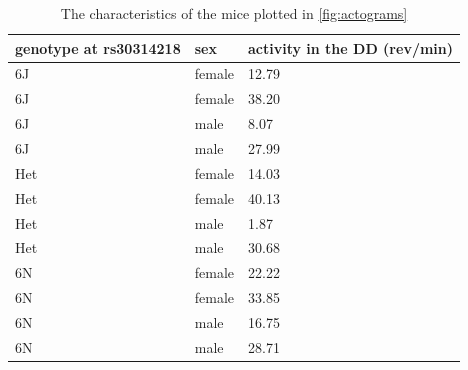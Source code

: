         \begin{table}
            \centering
            \caption{The characteristics of the mice plotted in \autoref{fig:actograms}}
            \begin{tabular}{p{2.5cm}lp{3cm}}
                \hline
                genotype at \newline rs30314218 & sex & activity in the DD (rev/min)\\
                \hline
                6J & female & 12.79 \\ 
                6J & female & 38.20 \\ 
                6J & male & 8.07 \\ 
                6J & male & 27.99 \\ 
                Het & female & 14.03 \\ 
                Het & female & 40.13 \\ 
                Het & male & 1.87 \\ 
                Het & male & 30.68 \\ 
                6N & female & 22.22 \\ 
                6N & female & 33.85 \\ 
                6N & male & 16.75 \\ 
                6N & male & 28.71 \\ 
            \hline
        \end{tabular}
        \label{tab:acto_mice}
    \end{table}

    \newpage

